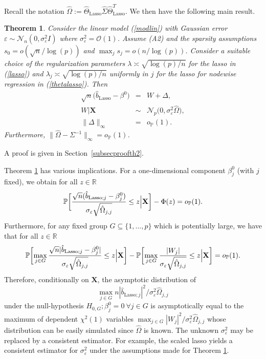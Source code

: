 \documentclass[aos,MSNbibl,dvips]{arximspdf}
\def\cal{\mathcal}
\newtheorem{theo}{Theorem}[section]
\newcommand{\PP}{\mathbb{P}}
\newcommand{\R}{\mathbb{R}}
\newcommand{\eps}{\varepsilon}
\newcommand{\bx}{\mathbf{X}}
\begin{document}
Recall the notation
$\hat\Omega:=\hat{\Theta}_{\mathrm{Lasso}} \hat{\Sigma} \hat
{\Theta
}_{\mathrm{Lasso}}^T$.
We then have the following main result.
%
\begin{theo}\label{th2}
Consider the linear model (\ref{modlin}) with Gaussian error $\eps
\sim
{\cal N}_n(0,\sigma_{\eps}^2 I)$ where $\sigma_{\varepsilon}^2 =
{\mathcal
O} (1)$. Assume \textup{(A2)} and the sparsity
assumptions $s_{0} = o(\sqrt n / \log(p))$ and $\max_j s_{j}
= o(n/\log(p))$.\vadjust{\goodbreak} Consider a suitable choice of the
regularization parameters
$\lambda\asymp\sqrt{\log(p)/n}$ for the lasso in
(\ref{lasso}) and $\lambda_j \asymp
\sqrt{\log(p)/n}$ uniformly in $j$ for
the lasso for nodewise regression in (\ref{thetalasso}). Then
%
\begin{eqnarray*}
\sqrt{n}\bigl(\hat{b}_{\mathrm{Lasso}} - \beta^0\bigr)& =& W +
\Delta,
\\
W|\bx&\sim&{\cal N}_{p}\bigl(0,\sigma^2_{\eps}
\hat\Omega\bigr),
\\
\|\Delta\|_{\infty} &=&o_{\PP}(1).
\end{eqnarray*}
%
Furthermore, $\|\hat\Omega- \Sigma^{-1}\|_{\infty} = o_{\PP}(1)$.
\end{theo}
%
A proof is given in Section~\ref{subsecproofth2}.

Theorem \ref{th2} has various implications. For a one-dimensional component
$\beta_j^0$ (with $j$ fixed),
we obtain for all $z \in\R$
%
\begin{equation}
\label{one-dimens} \PP \biggl[{ \sqrt{n}(\hat{b}_{\mathrm{Lasso};j} - \beta^0_j)
\over
\sigma_{\eps}
\sqrt{\hat\Omega_{j,j}}} \le z \Big|\bx \biggr] - \Phi(z) =
o_{\PP}(1).
\end{equation}
%
Furthermore, for any fixed group $G \subseteq\{1,\ldots,p\}$ which is
potentially large, we have that
for all $z \in\R$
%
\[
\PP \biggl[\max_{j \in G} { \sqrt{n}|\hat{b}_{\mathrm{Lasso};j} -
\beta
^0_j| \over
\sigma_{\eps} \sqrt{\hat\Omega_{j,j}}} \le z \Big| \bx
\biggr] - \PP \biggl[\max_{j \in G} { |W_{j}| \over
\sigma_{\eps} \sqrt{\hat\Omega_{j,j}}}\le z \Big|
\bx \biggr] = o_{\PP}(1).
\]
%
Therefore, conditionally on $\bx$, the asymptotic distribution of
%
\[
\max_{j \in G} {n}|\hat{b}_{\mathrm{Lasso};j}|^2 /
\sigma_{\eps}^2 {\hat\Omega_{j,j}} %
\]
%
under the null-hypothesis
$H_{0,G}; \beta^0_j = 0\ \forall j \in G$ is asymptotically
equal to the maximum of dependent $\chi^2 (1)$ variables $\max_{j \in G}
|W_{j}|^2/ \sigma_{\eps}^2 {\hat\Omega_{j,j}} $ whose distribution can
be easily simulated since $\hat\Omega$
is known. The unknown $\sigma_{\varepsilon}^2$ may be replaced by a
consistent estimator. For example, the scaled lasso \cite{sunzhang11} yields
a consistent estimator for $\sigma_{\varepsilon}^2$ under the assumptions
made for
Theorem \ref{th2}.
\end{document}
